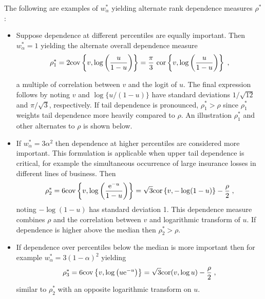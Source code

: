 \documentclass[authoryear]{elsarticle}
\newcommand{\cov}{{\rm cov}}
\newcommand{\cor}{\mathrm{cor}}
\newcommand{\e}{\mathrm{e}}
\newcommand{\de}{\mathrm{d}}
\begin{document}
The following are examples of $w_\alpha^*$ yielding alternate rank dependence measures $\rho^*$:
\begin{itemize}

\item Suppose dependence at different percentiles are equally important. Then $w^*_\alpha=1$ yielding the alternate overall dependence measure
$$
\rho^*_1 =2\cov\left\{v,\log\left(\frac{u}{1-u}\right)\right\}
= \frac{\pi}{3}\ \cor\left\{v,\log\left(\frac{u}{1-u}\right)\right\} \;,
$$

a multiple of correlation between $v$ and the logit of $u$. The final expression follows by noting $v$ and $\log\{u/(1-u)\}$ have standard deviations $1/\sqrt{12}$ and $\pi/\sqrt{3}$, respectively. If tail dependence is pronounced, $\rho_1^*>\rho$ since $\rho^*_1$ weights tail dependence more heavily compared to $\rho$. An illustration $\rho_1^*$ and other alternates to $\rho$ is shown below.

\item If $w^*_\alpha=3\alpha^2$  then dependence at higher percentiles are considered more important. This formulation is applicable when upper tail dependence is critical, for example the simultaneous occurrence of large insurance losses in different lines of business. Then
$$
\rho_2^* = 6\cov\left\{v,\log\left(\frac{\e^{-u}}{1-u}\right) \right\}
=\sqrt{3} \cor\left\{v,-\log(1-u)\right\}-\frac{\rho}{2}\;,
$$
noting $-\log(1-u)$ has standard deviation 1. This dependence measure combines $\rho$ and the correlation between $v$ and logarithmic transform of $u$. If dependence is higher above the median then $\rho_2^*>\rho$.

\item If dependence over percentiles below the median is more important then for example  $w^*_\alpha=3(1-\alpha)^2$ yielding
$$
\rho_3^* = 6\cov\left\{v,\log \left( u \e^{-u}\right) \right\}
= \sqrt{3}\cor(v,\log u )-\frac{\rho}{2}  \;,
$$
similar to $\rho_2^*$ with an opposite logarithmic transform on $u$.


\end{itemize}
\end{document}

